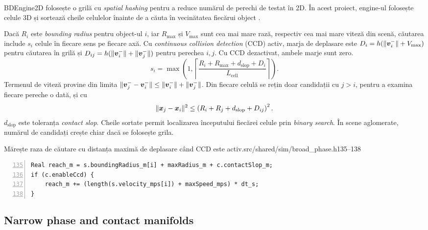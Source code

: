 \documentclass[11pt,a4paper]{article}
\begin{document}
BDEngine2D folosește o grilă cu \emph{spatial hashing} pentru a
reduce numărul de perechi de testat în 2D. În acest proiect,
engine-ul folosește celule 3D și sortează cheile celulelor înainte
de a căuta în vecinătatea fiecărui object \cite{medium-grid}.

Dacă \(R_i\) este \emph{bounding radius} pentru object-ul \(i\), iar
\(R_{\max}\) și \(V_{\max}\) sunt cea mai mare rază, respectiv cea mai mare viteză din scenă,
căutarea include \(s_i\) celule în fiecare sens pe fiecare axă.
Cu \emph{continuous collision detection} (CCD) activ, marja
de deplasare este \(D_i=h(\|\boldsymbol{v}_i^-\|+V_{\max})\) pentru
căutarea în grilă și \(D_{ij}=h(\|\boldsymbol{v}_i^-\|+\|\boldsymbol{v}_j^-\|)\)
pentru perechea \(i,j\). Cu CCD dezactivat, ambele marje sunt zero.
\begin{equation}
 s_i=\max\!\left(1,\left\lceil
 \frac{R_i+R_{\max}+d_{\mathrm{slop}}+D_i}
      {L_{\mathrm{cell}}}\right\rceil\right).
\end{equation}
Termenul de viteză provine din limita
\(\|\boldsymbol{v}_j^--\boldsymbol{v}_i^-\|\leq\|\boldsymbol{v}_i^-\|+\|\boldsymbol{v}_j^-\|\).
Din fiecare celulă se rețin doar candidații cu \(j>i\), pentru a
examina fiecare pereche o dată, și cu
\begin{equation}
 \|\boldsymbol{x}_j-\boldsymbol{x}_i\|^2\leq
 \left(R_i+R_j+d_{\mathrm{slop}}+D_{ij}\right)^2.
\end{equation}
\(d_{\mathrm{slop}}\) este toleranța \emph{contact slop}. Cheile sortate permit
localizarea începutului fiecărei celule prin \emph{binary search}.
În scene aglomerate, numărul de candidați crește chiar dacă se
folosește grila.
\begin{codefragment}{Mărește raza de căutare cu distanța maximă de deplasare când CCD este activ.}{src/shared/sim/broad_phase.h}{135--138}
\begin{lstlisting}[numbers=left,firstnumber=135]
Real reach_m = s.boundingRadius_m[i] + maxRadius_m + c.contactSlop_m;
if (c.enableCcd) {
    reach_m += (length(s.velocity_mps[i]) + maxSpeed_mps) * dt_s;
}
\end{lstlisting}
\end{codefragment}

\subsection{Narrow phase and contact manifolds}
\end{document}
